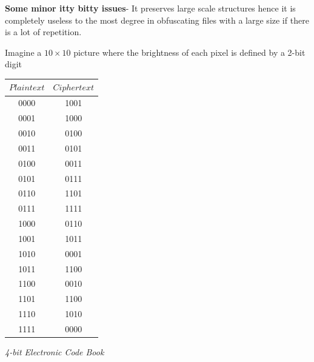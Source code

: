 			\begin{mybox}
				\raggedright \LARGE{\textbf{Some minor itty bitty issues}}- \normalsize It preserves large scale structures hence it is completely useless to the most degree in obfuscating files with a large size if there is a lot of repetition.
			\end{mybox}

			Imagine a $10\times10$ picture where the brightness of each pixel is defined by a 2-bit digit
			\begin{center}
			\begin{tabular}{ c | c }
				 $Plaintext$ & $Ciphertext$ \\ 
				 \hline
				 0000 & 1001\\  
				 0001 & 1000\\
				 0010 & 0100\\
				 0011 & 0101\\
				 0100 & 0011\\
				 0101 & 0111\\
				 0110 & 1101\\
				 0111 & 1111\\
				 1000 & 0110\\  
				 1001 & 1011\\
				 1010 & 0001\\
				 1011 & 1100\\
				 1100 & 0010\\
				 1101 & 1100\\
				 1110 & 1010\\
				 1111 & 0000
			\end{tabular}
			\end{center}
			\centering\emph{{4-bit Electronic Code Book}}


